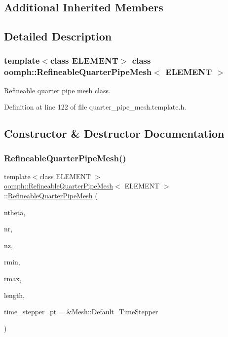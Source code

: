 \subsection*{Additional Inherited Members}


\subsection{Detailed Description}
\subsubsection*{template$<$class E\+L\+E\+M\+E\+NT$>$\newline
class oomph\+::\+Refineable\+Quarter\+Pipe\+Mesh$<$ E\+L\+E\+M\+E\+N\+T $>$}

Refineable quarter pipe mesh class. 

Definition at line 122 of file quarter\+\_\+pipe\+\_\+mesh.\+template.\+h.



\subsection{Constructor \& Destructor Documentation}
\mbox{\label{classoomph_1_1RefineableQuarterPipeMesh_ac4b3f592279a2437487ddce284b406a6}} 
\subsubsection{\texorpdfstring{Refineable\+Quarter\+Pipe\+Mesh()}{RefineableQuarterPipeMesh()}}
{\footnotesize\ttfamily template$<$class E\+L\+E\+M\+E\+NT $>$ \\
\hyperlink{classoomph_1_1RefineableQuarterPipeMesh}{oomph\+::\+Refineable\+Quarter\+Pipe\+Mesh}$<$ E\+L\+E\+M\+E\+NT $>$\+::\hyperlink{classoomph_1_1RefineableQuarterPipeMesh}{Refineable\+Quarter\+Pipe\+Mesh} (\begin{DoxyParamCaption}\item[{const unsigned \&}]{ntheta,  }\item[{const unsigned \&}]{nr,  }\item[{const unsigned \&}]{nz,  }\item[{const double \&}]{rmin,  }\item[{const double \&}]{rmax,  }\item[{const double \&}]{length,  }\item[{Time\+Stepper $\ast$}]{time\+\_\+stepper\+\_\+pt = {\ttfamily \&Mesh\+:\+:Default\+\_\+TimeStepper} }\end{DoxyParamCaption})\hspace{0.3cm}{\ttfamily [inline]}}



